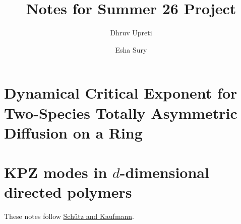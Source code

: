 \documentclass{article}
\begin{document}
\title{Notes for Summer 26 Project}
\author{Dhruv Upreti \and Esha Sury}
\maketitle

\thispagestyle{empty}



\section{Dynamical Critical Exponent for Two-Species Totally Asymmetric Diffusion on a Ring}

\section{KPZ modes in $d$-dimensional directed polymers}

These notes follow \href{https://www.math.purdue.edu/~ebkaufma/PhysRevE.96.032119.pdf}{Schütz and Kaufmann}. 
\end{document}
